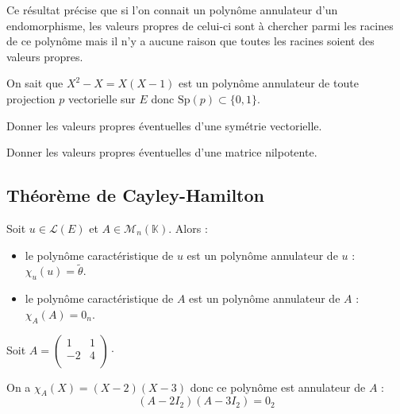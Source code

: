 \documentclass[a4paper,10pt]{report}
\begin{document}
 \medskip
 
 \begin{att} Ce résultat précise que si l'on connait un polynôme annulateur d'un endomorphisme, les valeurs propres de celui-ci sont à chercher parmi les racines de ce polynôme mais il n'y a aucune raison que toutes les racines soient des valeurs propres.
 \end{att}
 
 \medskip
 
 \begin{ex} On sait que $X^2-X=X(X-1)$ est un polynôme annulateur de toute projection $p$ vectorielle sur $E$ donc $\textrm{Sp}(p) \subset \lbrace 0,1 \rbrace$. 
 \end{ex}
 
 \begin{exa} Donner les valeurs propres éventuelles d'une symétrie vectorielle.
 \end{exa}
 
 \begin{exa} Donner les valeurs propres éventuelles d'une matrice nilpotente.
 \end{exa}
 
 \subsection{Théorème de Cayley-Hamilton}
 
 \begin{thm} Soit $u \in \mathcal{L}(E)$ et $A \in \mathcal{M}_n(\mathbb{K})$. Alors :
 \begin{itemize}
\item le polynôme caractéristique de $u$ est un polynôme annulateur de $u$ : $\chi_u(u)= \tilde{\theta}$.
\item le polynôme caractéristique de $A$ est un polynôme annulateur de $A$ : $\chi_A(A)= 0_n$.
\end{itemize}
 \end{thm}
 
 
 \begin{ex} Soit $A = \begin{pmatrix}
 1 & 1 \\
 -2 & 4 \\
 \end{pmatrix} \cdot$
 
 \medskip
 
 \noindent On a $\chi_A(X) = (X-2)(X-3)$ donc ce polynôme est annulateur de $A$ : 
 $$ (A- 2I_2)(A-3 I_2) = 0_2 $$
 \end{ex}
 
\end{document}

